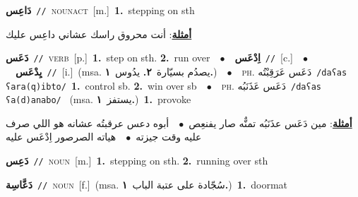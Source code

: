 \documentclass[10pt,a4paper,twoside]{article} %
\begin{document}
\begin{multicols}{2}
{\setlength\topsep{0pt}\textbf{\foreignlanguage{arabic}{دَاعِس}}\ {\color{gray}\texttt{//}\color{black}}\ \textsc{noun\textunderscore act}\ [m.]\ \textbf{1.}~stepping on sth\  \begin{flushright}\color{gray}\foreignlanguage{arabic}{\textbf{\underline{\foreignlanguage{arabic}{أمثلة}}}: أنت محروق راسك عشاني داعِس عليك}\end{flushright}\color{black}} \vspace{2mm}

{\setlength\topsep{0pt}\textbf{\foreignlanguage{arabic}{دَعَس}}\ {\color{gray}\texttt{//}\color{black}}\ \textsc{verb}\ [p.]\ \textbf{1.}~step on sth.  \textbf{2.}~run over\ \ $\bullet$\ \ \setlength\topsep{0pt}\textbf{\foreignlanguage{arabic}{اِدْعَس}}\ {\color{gray}\texttt{//}\color{black}}\ [c.]\ \ $\bullet$\ \ \setlength\topsep{0pt}\textbf{\foreignlanguage{arabic}{يِدْعَس}}\ {\color{gray}\texttt{//}\color{black}}\ [i.]\ \color{gray}(msa. \foreignlanguage{arabic}{يصدُم بسيّارة}~\foreignlanguage{arabic}{\textbf{٢.}}  \foreignlanguage{arabic}{يدُوس}~\foreignlanguage{arabic}{\textbf{١.}})\color{black}\ \ $\bullet$\ \ \textsc{ph.} \color{gray} \foreignlanguage{arabic}{دَعَس عَرَقِبْتُه}\color{black}\ {\color{gray}\texttt{/{\sffamily daʕas ʕara(q)ibto}/}\color{black}}\ \textbf{1.}~control sb.  \textbf{2.}~win over sb\ \ $\bullet$\ \ \textsc{ph.} \color{gray} \foreignlanguage{arabic}{دَعَس عَذَنَبُه}\color{black}\ {\color{gray}\texttt{/{\sffamily daʕas ʕa(d)anabo}/}\color{black}}\ \color{gray} (msa. \foreignlanguage{arabic}{يستفز}~\foreignlanguage{arabic}{\textbf{١.}})\color{black}\ \textbf{1.}~provoke\  \begin{flushright}\color{gray}\foreignlanguage{arabic}{\textbf{\underline{\foreignlanguage{arabic}{أمثلة}}}: مين دَعَس عذَنَبُه تمنٌّه صار يفنعِص\ $\bullet$\ \  أبوه دعس عرقبتُه عشانه هو اللي صرف عليه وقت جيزته\ $\bullet$\ \  هياته الصرصور اِدْعَس عليه}\end{flushright}\color{black}} \vspace{2mm}

{\setlength\topsep{0pt}\textbf{\foreignlanguage{arabic}{دَعِس}}\ {\color{gray}\texttt{//}\color{black}}\ \textsc{noun}\ [m.]\ \textbf{1.}~stepping on sth.  \textbf{2.}~running over sth\ } \vspace{2mm}

{\setlength\topsep{0pt}\textbf{\foreignlanguage{arabic}{دَعَّاسِة}}\ {\color{gray}\texttt{//}\color{black}}\ \textsc{noun}\ [f.]\ \color{gray}(msa. \foreignlanguage{arabic}{سُجّادة على عتبة الباب}~\foreignlanguage{arabic}{\textbf{١.}})\color{black}\ \textbf{1.}~doormat\ } \vspace{2mm}


\end{multicols}
\end{document}
